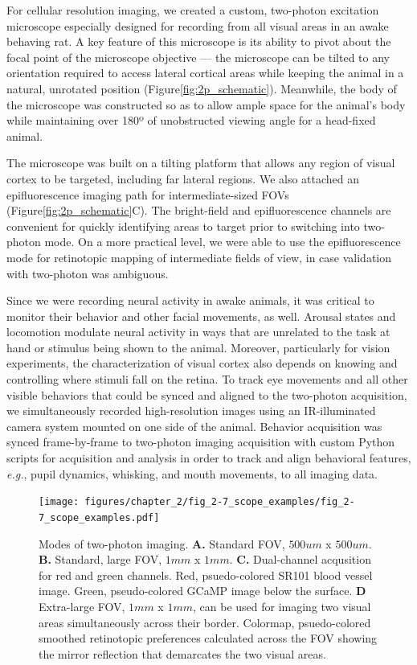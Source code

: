 For cellular resolution imaging, we created a custom, two-photon excitation microscope especially designed for recording from all visual areas in an awake behaving rat. A key feature of this microscope is its ability to pivot about the focal point of the microscope objective --- the microscope can be tilted to any orientation required to access lateral cortical areas while keeping the animal in a natural, unrotated position (Figure\ref{fig:2p_schematic}). Meanwhile, the body of the microscope was constructed so as to allow ample space for the animal's body while maintaining over 180º of unobstructed viewing angle for a head-fixed animal.

The microscope was built on a tilting platform that allows any region of visual cortex to be targeted, including far lateral regions. We also attached an epifluorescence imaging path for intermediate-sized FOVs (Figure\ref{fig:2p_schematic}C). The bright-field and epifluorescence channels are convenient for quickly identifying areas to target prior to switching into two-photon mode. On a more practical level, we were able to use the epifluorescence mode for retinotopic mapping of intermediate fields of view, in case validation with two-photon was ambiguous. 

Since we were recording neural activity in awake animals, it was critical to monitor their behavior and other facial movements, as well. Arousal states and locomotion modulate neural activity in ways that are unrelated to the task at hand or stimulus being shown to the animal. Moreover, particularly for vision experiments, the characterization of visual cortex also depends on knowing and controlling where stimuli fall on the retina. To track eye movements and all other visible behaviors that could be synced and aligned to the two-photon acquisition, we simultaneously recorded high-resolution images using an IR-illuminated camera system mounted on one side of the animal. Behavior acquisition was synced frame-by-frame to two-photon imaging acquisition with custom Python scripts for acquisition and analysis in order to track and align behavioral features, \textit{e.g.}, pupil dynamics, whisking, and mouth movements, to all imaging data.

\begin{figure}[t!]
    \texttt{[image: figures/chapter\_2/fig\_2-7\_scope\_examples/fig\_2-7\_scope\_examples.pdf]}
    \vspace{.1in}
    \caption[Two-photon imaging modes]{Modes of two-photon imaging. \textbf{A.} Standard FOV, $500um$ x $500um$. \textbf{B.} Standard, large FOV, $1mm$ x $1mm$. \textbf{C.} Dual-channel acqusition for red and green channels. Red, psuedo-colored SR101 blood vessel image. Green, pseudo-colored GCaMP image below the surface. \textbf{D} Extra-large FOV, $1mm$ x $1mm$, can be used for imaging two visual areas simultaneously across their border. Colormap, psuedo-colored smoothed retinotopic preferences calculated across the FOV showing the mirror reflection that demarcates the two visual areas. 
    \label{fig:scope_examples}}
\end{figure}

